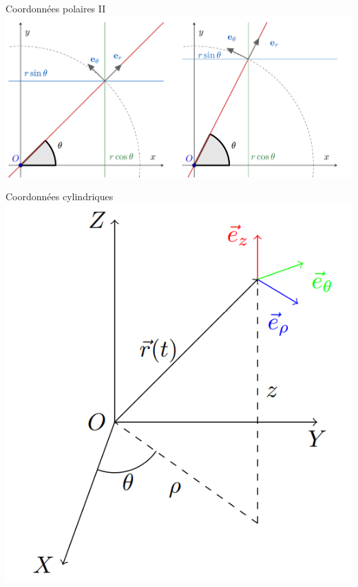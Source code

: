 \documentclass[xcolor=table]{beamer}
\begin{document}
\begin{frame}{Coordonnées polaires II}
\centering
    \includegraphics[scale = 0.6]{Images/Polaire}
\end{frame}



\begin{frame}{Coordonnées cylindriques}
    \centering
    \includegraphics[scale = 0.9]{Images/Cylindrique}
\end{frame}
\end{document}
